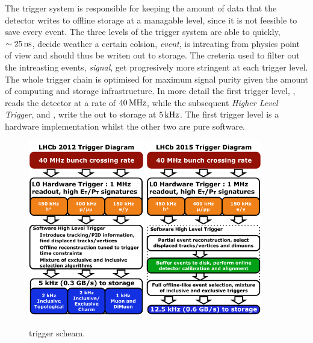 The trigger system is responsible for keeping the amount of data that the detector writes to offline storage
at a managable level, since it is not feesible to save every event. The three levels of the \lhcb trigger system
are able to quickly, $\sim 25{\rm \,ns}$, decide weather a certain colsion, {\it event}, is intreating from physics point
of view and should thus be writen out to storage. The creteria used to filter out the intreasting events, {\it signal}, get
progresively more stringent at each trigger level. The whole trigger chain is optimised for maximum
signal purity given the amount of computing and storage infrastructure. In more detail the first trigger
level, \lzero, reads the detector at a rate of $40{\rm \,MHz}$, while the subsequent {\it Higher Level Trigger},
\hltone and \hlttwo, write the out to storage at $5{\rm \,kHz}$. The first trigger level is a hardware implementation
whilst the other two are pure software.

\begin{figure}[t]
  \centering
  \includegraphics[width=0.45\textwidth]{Figures/Chapter2/LHCb_Trigger_RunIAlgDetail_May2015}
  \hspace{0.2cm}
  \includegraphics[width=0.45\textwidth]{Figures/Chapter2/LHCb_Trigger_RunII_May2015}
  \caption{\runone trigger scheam.}
  \label{run_one_trigger}
\end{figure}


